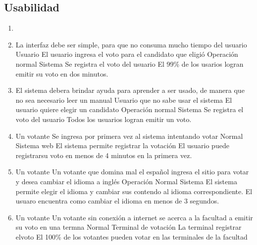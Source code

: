 \subsection{Usabilidad}

\begin{enumerate}


\item  {}

\medskip

\item  \escenario
{La interfaz debe ser simple, para que no consuma mucho tiempo del usuario}
{Usuario}
{El usuario ingresa el voto para el candidato que eligió}
{Operación normal}
{Sistema}
{Se registra el voto del usuario}
{El 99\% de los usarios logran emitir su voto en dos minutos.}
\medskip
\item  \escenario
{El sistema debera brindar ayuda para aprender a ser usado, de manera que no sea necesario leer un manual}
{Usuario que no sabe usar el sistema}
{El usuario quiere elegir un candidato}
{Operación normal}
{Sistema}
{Se registra el voto del usuario}
{Todos los usuarios logran emitir un voto.}
\medskip

\item  {}
{Un votante}
{Se ingresa por primera vez al sistema intentando votar}
{Normal}
{Sistema web}
{El sistema permite registrar la votaci\'on}
{El usuario puede registrarsu voto en menos de 4 minutos en la primera vez.}

\medskip
\item   {}
{Un votante}
{Un votante que domina mal el espa\~nol ingresa el sitio para votar y desea cambiar el idioma a ingl\'es}
{Operación Normal}
{Sistema}
{El sistema permite elegir el idioma y cambiar sus contendo al idioma correspondiente.}
{El usuaro encuentra como cambiar el idioma en menos de 3 segundos.}
\medskip

\item   {}
{Un votante}
{Un votante sin conexión a internet se acerca a la facultad a emitir su voto en una termna}
{Normal}
{Terminal de votaci\'on}
{La terminal registrar elvoto}
{El 100\% de los votantes pueden votar en las terminales de la facultad}

\end{enumerate}
